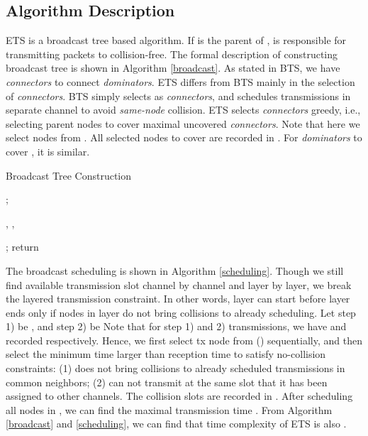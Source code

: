 \documentclass[10pt, conference]{IEEEtran}
\begin{document}
\subsection{Algorithm Description}
ETS is a broadcast tree based algorithm. If  is the parent
of ,  is responsible for transmitting packets to 
collision-free. The formal description of constructing
broadcast tree is shown in Algorithm \ref{broadcast}. As stated
in BTS, we have \emph{connectors} to connect \emph{dominators}.
ETS differs from BTS mainly in the selection of
\emph{connectors}. BTS simply selects  as
\emph{connectors}, and schedules transmissions in separate
channel to avoid \emph{same-node} collision. ETS selects
\emph{connectors} greedy, i.e., selecting parent nodes to cover
maximal uncovered \emph{connectors}. Note that here we select
nodes from .  All selected nodes to cover 
are recorded in . For \emph{dominators}  to
cover , it is similar.





\begin{algorithm}[tbp]  \label{broadcast}
\caption{Broadcast Tree Construction}
\KwIn{}
\KwOut{}
{
    ;
}
{
 {
    {
        \;
        , \;
        {
            \;
        }
        \;
    }
    {
         \;
        , \;
        {
            \;
        }
        \;
    }

 }
}
; \;
return \;
\end{algorithm}



The broadcast scheduling is shown in Algorithm
\ref{scheduling}. Though we still find available transmission
slot channel by channel and layer by layer, we break the
layered transmission constraint. In other words, layer 
can start before layer  ends only if nodes in layer  do
not bring collisions to already scheduling. Let step 1) be
, and step 2) be  Note that for step 1) and 2)
transmissions, we have  and  recorded
respectively. Hence, we first select tx node  from 
() sequentially, and then select the minimum time 
larger than reception time to satisfy no-collision constraints:
(1)  does not bring collisions to already scheduled
transmissions in common neighbors; (2)  can not transmit at
the same slot that it has been assigned to other channels. The
collision slots are recorded in . After scheduling all
nodes in , we can find the maximal transmission time .
From Algorithm \ref{broadcast} and \ref{scheduling}, we can
find that time complexity of ETS is also .
\end{document}
